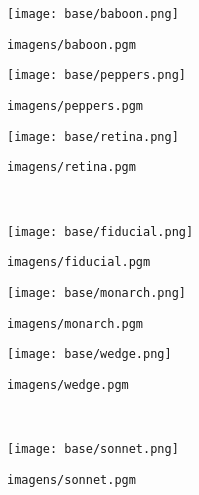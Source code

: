 \begin{subfigure}{0.33\textwidth}
    \centering
    \texttt{[image: base/baboon.png]}
    \caption{\texttt{imagens/baboon.pgm}}
    \label{fig:baboon}
\end{subfigure}%
\begin{subfigure}{0.33\textwidth}
    \centering
    \texttt{[image: base/peppers.png]}
    \caption{\texttt{imagens/peppers.pgm}}
    \label{fig:peppers}
\end{subfigure}%
\begin{subfigure}{0.33\textwidth}
    \centering
    \texttt{[image: base/retina.png]}
    \caption{\texttt{imagens/retina.pgm}}
    \label{fig:retina}
\end{subfigure}\\[8pt]
\begin{subfigure}{0.33\textwidth}
    \centering
    \texttt{[image: base/fiducial.png]}
    \caption{\texttt{imagens/fiducial.pgm}}
    \label{fig:fiducial}
\end{subfigure}%
\begin{subfigure}{0.33\textwidth}
    \centering
    \texttt{[image: base/monarch.png]}
    \caption{\texttt{imagens/monarch.pgm}}
    \label{fig:monarch}
\end{subfigure}%
\begin{subfigure}{0.33\textwidth}
    \centering
    \texttt{[image: base/wedge.png]}
    \caption{\texttt{imagens/wedge.pgm}}
    \label{fig:wedge}
\end{subfigure}\\[8pt]
\begin{subfigure}{0.33\textwidth}
    \centering
    \texttt{[image: base/sonnet.png]}
    \caption{\texttt{imagens/sonnet.pgm}}
    \label{fig:sonnet}
\end{subfigure}